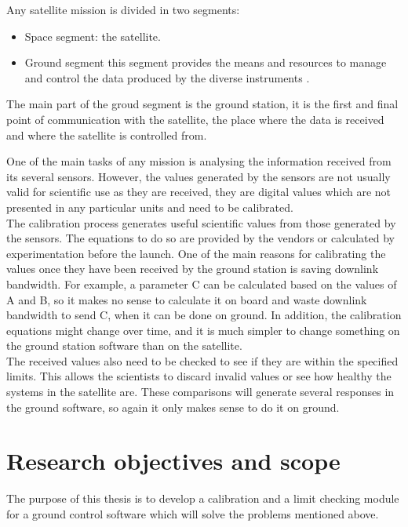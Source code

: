 Any satellite mission is divided in two segments:
\begin{itemize}

	\item Space segment: the satellite.
	\item Ground segment this segment provides the means and resources to manage and control the data produced by the diverse instruments \cite{ESA}. 

\end{itemize}

The main part of the groud segment is the ground station, it is the first and final point of communication with the satellite, the place where the data is received and where the satellite is controlled from.


One of the main tasks of any mission is analysing the information received from its several sensors. However, the values generated by the sensors are not usually valid for scientific use as they are received, they are digital values which are not presented in any particular units and need to be calibrated.\\

The calibration process generates useful scientific values from those generated by the sensors. The equations to do so are provided by the vendors or calculated by experimentation before the launch. One of the main reasons for calibrating the values once they have been received by the ground station is saving downlink bandwidth. For example, a parameter C can be calculated based on the values of A and B, so it makes no sense to calculate it on board and waste downlink bandwidth to send C, when it can be done on ground.  In addition, the calibration equations might change over time, and it is much simpler to change something on the ground station software than on the satellite.\\


The received values also need to be checked to see if they are within the specified limits. This allows the scientists to discard invalid values or see how healthy the systems in the satellite are. These comparisons will generate several responses in the ground software, so again it only makes sense to do it on ground. 
\pagebreak

\section{Research objectives and scope}

The purpose of this thesis is to develop a calibration and a limit checking module for a ground control software which will solve the problems mentioned above.\\

